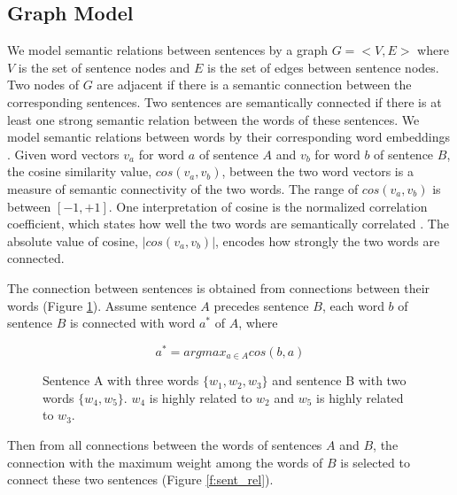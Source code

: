 \subsection{Graph Model} 
%
We model semantic relations between sentences by a graph
$G=\text{$<$}V,E\text{$>$}$ where $V$ is the set of sentence nodes and
$E$ is the set of edges between sentence nodes. Two nodes of $G$ are
adjacent if there is a semantic connection between the
corresponding sentences. Two sentences are semantically
connected if there is at least one strong semantic relation between
the words of these sentences. We model semantic relations between
words by their corresponding word embeddings
\cite{pennington14}. Given word vectors $v_a$ for word $a$ of sentence
$A$ and $v_b$ for word $b$ of sentence $B$, the cosine similarity
value, $cos(v_a,v_b)$, between the two word vectors is a measure of
semantic connectivity of the two words. The range of $cos(v_a,v_b)$
is between $[-1,+1]$. One interpretation of cosine is the normalized
correlation coefficient, which states how well the two words are
semantically correlated \cite{manning99}. The absolute value of
cosine, $|cos(v_a,v_b)|$, encodes how strongly the two words are
connected.

The connection between sentences is obtained from connections between their words (Figure \ref{f:wrd_rel}). Assume sentence $A$ precedes sentence $B$, each word $b$ of sentence $B$ is connected with word $a^*$ of $A$, where

\begin{equation*}
a^{*}= argmax_{a\in A}cos(b,a)
\end{equation*}

\begin{figure}[!ht]
\centering
\small
%
\caption{Sentence A with three words $\lbrace w_1,w_2,w_3 \rbrace$ and
  sentence B with two words $\lbrace w_4,w_5 \rbrace$. $w_4$ is highly
  related to $w_2$ and $w_5$ is highly related to $w_3$.} 
\label{f:wrd_rel}
\end{figure}



Then from all connections between the words of sentences $A$ and $B$,
the connection with the maximum weight among the words of $B$ is
selected to connect these two sentences (Figure \ref{f:sent_rel}).

